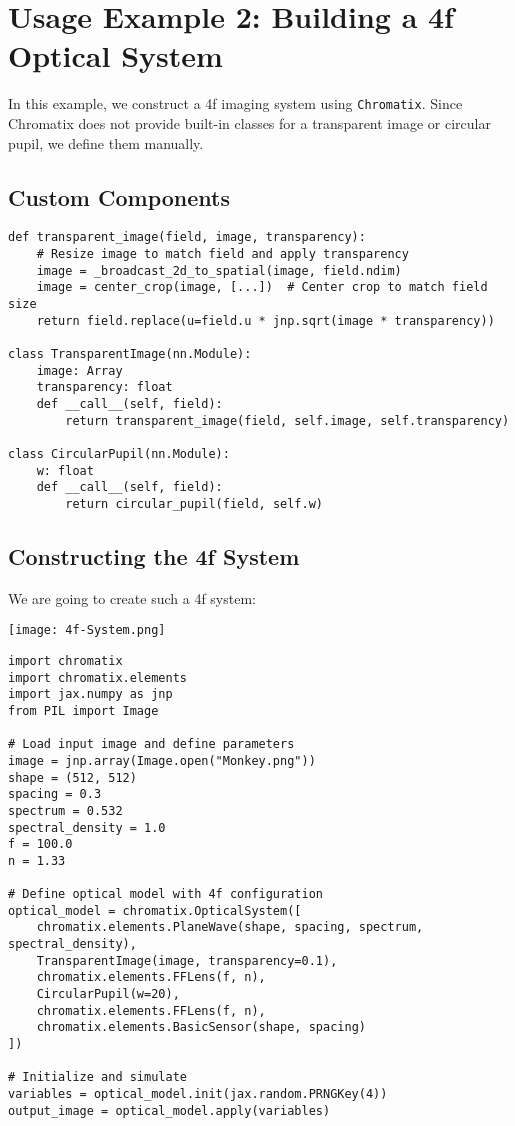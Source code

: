 \documentclass[a4paper,12pt]{report}
\begin{document}
\section{Usage Example 2: Building a 4f Optical System}

In this example, we construct a 4f imaging system using \texttt{Chromatix}. Since Chromatix does not provide built-in classes for a transparent image or circular pupil, we define them manually.

\subsection*{Custom Components}

\begin{verbatim}
def transparent_image(field, image, transparency):
    # Resize image to match field and apply transparency
    image = _broadcast_2d_to_spatial(image, field.ndim)
    image = center_crop(image, [...])  # Center crop to match field size
    return field.replace(u=field.u * jnp.sqrt(image * transparency))

class TransparentImage(nn.Module):
    image: Array
    transparency: float
    def __call__(self, field):
        return transparent_image(field, self.image, self.transparency)

class CircularPupil(nn.Module):
    w: float
    def __call__(self, field):
        return circular_pupil(field, self.w)
\end{verbatim}

\subsection{Constructing the 4f System}

We are going to create such a 4f system:

\begin{center}
  \texttt{[image: 4f-System.png]}
\end{center}

\begin{verbatim}
import chromatix
import chromatix.elements
import jax.numpy as jnp
from PIL import Image

# Load input image and define parameters
image = jnp.array(Image.open("Monkey.png"))
shape = (512, 512)
spacing = 0.3
spectrum = 0.532
spectral_density = 1.0
f = 100.0
n = 1.33

# Define optical model with 4f configuration
optical_model = chromatix.OpticalSystem([
    chromatix.elements.PlaneWave(shape, spacing, spectrum, spectral_density),
    TransparentImage(image, transparency=0.1),
    chromatix.elements.FFLens(f, n),
    CircularPupil(w=20),
    chromatix.elements.FFLens(f, n),
    chromatix.elements.BasicSensor(shape, spacing)
])

# Initialize and simulate
variables = optical_model.init(jax.random.PRNGKey(4))
output_image = optical_model.apply(variables)
\end{verbatim}
\end{document}
